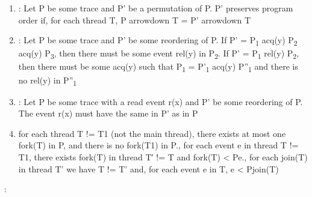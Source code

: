 \documentclass[landscape, a4paper]{article}
\begin{document}
\begin{minipage}[t]{0.195\linewidth}
\begin{enumerate}
		\item {}: Let P be some trace and P' be a permutation of P. P' preserves program order if, for each thread T, P arrowdown T = P' arrowdown T
		\item {}: Let P be some trace and P' be some reordering of P. If P' = P\textsubscript{1} acq(y) P\textsubscript{2} acq(y) P\textsubscript{3}, then there must be some event rel(y) in P\textsubscript{2}. If P' = P\textsubscript{1} rel(y) P\textsubscript{2}, then there must be some acq(y) such that P\textsubscript{1} = P'\textsubscript{1} acq(y) P''\textsubscript{1} and there is no rel(y) in P''\textsubscript{1}
		\item {}: Let P be some trace with a read event r(x) and P' be some reordering of P. The event r(x) must have the same  in P' as in P
		\item {}  for each thread T != T1 (not the main thread), there exists at most one fork(T) in P, and there is no fork(T1) in P.,  for each event e in thread T != T1, there exists fork(T) in thread T′ != T and fork(T) < Pe.,  for each join(T) in thread T' we have T != T' and, for each event e in T, e < Pjoin(T)
	\end{enumerate}
	\begin{betterlist}
		\item {}:
		\vspace{-0.25cm}


\end{betterlist}
\end{minipage}
\end{document}
